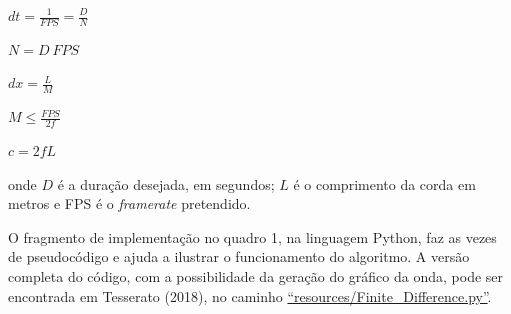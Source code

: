 \documentclass[]{article}
\begin{document}
\(dt = \frac{1}{FPS} = \frac{D}{N}\)

\(N = D ~ FPS\)

\(dx = \frac{L}{M}\)

\(M \le \frac{FPS}{2f}\)

\(c = 2fL\)

onde \(D\) é a duração desejada, em segundos; \(L\) é o comprimento da
corda em metros e FPS é o \emph{framerate} pretendido.

O fragmento de implementação no quadro 1, na linguagem Python, faz as
vezes de pseudocódigo e ajuda a ilustrar o funcionamento do algoritmo. A
versão completa do código, com a possibilidade da geração do gráfico da
onda, pode ser encontrada em Tesserato (2018), no caminho
\href{https://github.com/tesserato/Dissertacao/blob/master/Finite_Difference.py}{``resources/Finite\_Difference.py''}.
\end{document}
